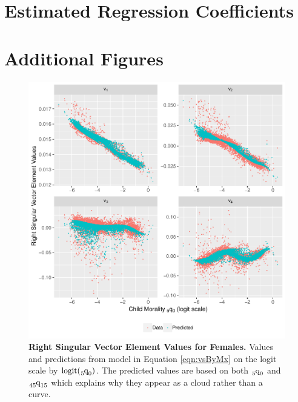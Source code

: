 \documentclass[11pt]{article}
\newcommand{\qf}{\tensor*[_5]{\mbox{q}}{_0}}
\newcommand{\qff}{\tensor*[_{45}]{\mbox{q}}{_{15}}}
\newcommand{\logit}{\mbox{logit}}
\begin{document}
\begin{appendices}
\newpage
\section{Estimated Regression Coefficients} \label{app:regs}









\newpage
\section{Additional Figures} \label{app:figs}

\begin{figure}[htbp]
   \centering
   \includegraphics[width=0.94\linewidth]{../figures/fig2-1f.pdf} 
   \captionsetup{format=plain,font=normalsize,margin=0cm,justification=justified}
   \caption{\textbf{Right Singular Vector Element Values for Females.} Values and predictions from model in Equation \ref{eqn:vsByMx} on the logit scale by $\logit(\qf)$.  The predicted values are based on both $\qf$ and $\qff$ which explains why they appear as a cloud rather than a curve.}
   \label{fig:rsvF}
\end{figure}


\end{appendices}
\end{document}
